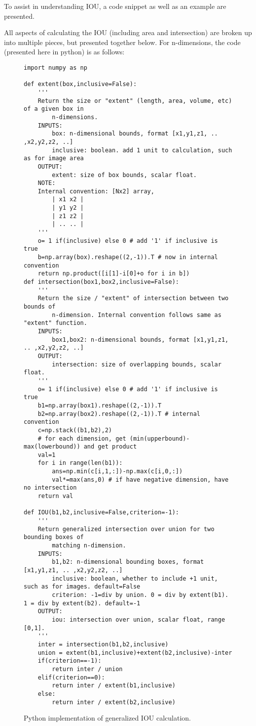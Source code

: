 To assist in understanding IOU, a code snippet as well as an example are presented.

All aspects of calculating the IOU (including area and intersection) are broken up into multiple pieces, but presented together below. For n-dimensions, the code (presented here in python) is as follows:


\begin{figure}[ht]
\begin{lstlisting}
import numpy as np

def extent(box,inclusive=False):
    '''
    Return the size or "extent" (length, area, volume, etc) of a given box in
        n-dimensions.
    INPUTS:
        box: n-dimensional bounds, format [x1,y1,z1, .. ,x2,y2,z2, ..]
        inclusive: boolean. add 1 unit to calculation, such as for image area
    OUTPUT:
        extent: size of box bounds, scalar float.
    NOTE:
    Internal convention: [Nx2] array,
        | x1 x2 |
        | y1 y2 |
        | z1 z2 |
        | .. .. |
    '''
    o= 1 if(inclusive) else 0 # add '1' if inclusive is true
    b=np.array(box).reshape((2,-1)).T # now in internal convention
    return np.product([i[1]-i[0]+o for i in b])
def intersection(box1,box2,inclusive=False):
    '''
    Return the size / "extent" of intersection between two bounds of
        n-dimension. Internal convention follows same as "extent" function.
    INPUTS:
        box1,box2: n-dimensional bounds, format [x1,y1,z1, .. ,x2,y2,z2, ..]
    OUTPUT:
        intersection: size of overlapping bounds, scalar float.
    '''
    o= 1 if(inclusive) else 0 # add '1' if inclusive is true
    b1=np.array(box1).reshape((2,-1)).T
    b2=np.array(box2).reshape((2,-1)).T # internal convention
    c=np.stack((b1,b2),2)
    # for each dimension, get (min(upperbound)-max(lowerbound)) and get product
    val=1
    for i in range(len(b1)):
        ans=np.min(c[i,1,:])-np.max(c[i,0,:])
        val*=max(ans,0) # if have negative dimension, have no intersection
    return val

def IOU(b1,b2,inclusive=False,criterion=-1):
    '''
    Return generalized intersection over union for two bounding boxes of
        matching n-dimension.
    INPUTS:
        b1,b2: n-dimensional bounding boxes, format [x1,y1,z1, .. ,x2,y2,z2, ..]
        inclusive: boolean, whether to include +1 unit, such as for images. default=False
        criterion: -1=div by union. 0 = div by extent(b1). 1 = div by extent(b2). default=-1
    OUTPUT:
        iou: intersection over union, scalar float, range [0,1].
    '''
    inter = intersection(b1,b2,inclusive)
    union = extent(b1,inclusive)+extent(b2,inclusive)-inter
    if(criterion==-1):
        return inter / union
    elif(criterion==0):
        return inter / extent(b1,inclusive)
    else:
        return inter / extent(b2,inclusive)

\end{lstlisting}
\onehalfspacing %
\caption{Python implementation of generalized IOU calculation.}
\label{code_iou}
\end{figure}

